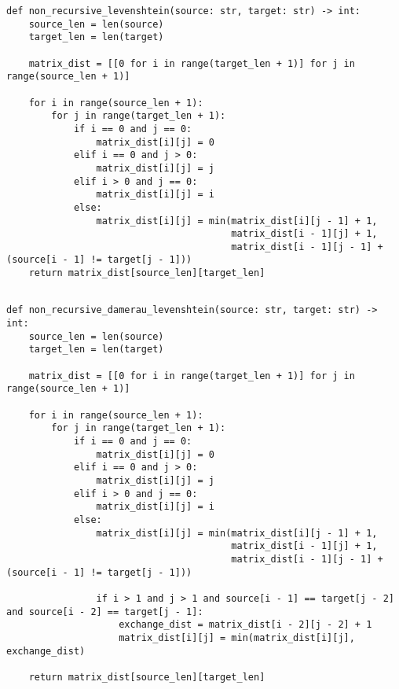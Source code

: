 \begin{lstlisting}[label=lst:non_rec_l,caption=Функция нахождения расстояния Левенштейна нерекурсивным методом.]
def non_recursive_levenshtein(source: str, target: str) -> int:
    source_len = len(source)
    target_len = len(target)

    matrix_dist = [[0 for i in range(target_len + 1)] for j in range(source_len + 1)]

    for i in range(source_len + 1):
        for j in range(target_len + 1):
            if i == 0 and j == 0:
                matrix_dist[i][j] = 0
            elif i == 0 and j > 0:
                matrix_dist[i][j] = j
            elif i > 0 and j == 0:
                matrix_dist[i][j] = i
            else:
                matrix_dist[i][j] = min(matrix_dist[i][j - 1] + 1,
                                        matrix_dist[i - 1][j] + 1,
                                        matrix_dist[i - 1][j - 1] + (source[i - 1] != target[j - 1]))
    return matrix_dist[source_len][target_len]
	
\end{lstlisting}

\begin{lstlisting}[label=lst:non_rec_dl,caption=Функция нахождения расстояния Дамерау--Левенштейна нерекурсивным методом.]
def non_recursive_damerau_levenshtein(source: str, target: str) -> int:
    source_len = len(source)
    target_len = len(target)

    matrix_dist = [[0 for i in range(target_len + 1)] for j in range(source_len + 1)]

    for i in range(source_len + 1):
        for j in range(target_len + 1):
            if i == 0 and j == 0:
                matrix_dist[i][j] = 0
            elif i == 0 and j > 0:
                matrix_dist[i][j] = j
            elif i > 0 and j == 0:
                matrix_dist[i][j] = i
            else:
                matrix_dist[i][j] = min(matrix_dist[i][j - 1] + 1,
                                        matrix_dist[i - 1][j] + 1,
                                        matrix_dist[i - 1][j - 1] + (source[i - 1] != target[j - 1]))

                if i > 1 and j > 1 and source[i - 1] == target[j - 2] and source[i - 2] == target[j - 1]:
                    exchange_dist = matrix_dist[i - 2][j - 2] + 1
                    matrix_dist[i][j] = min(matrix_dist[i][j], exchange_dist)

    return matrix_dist[source_len][target_len]
	
\end{lstlisting}

